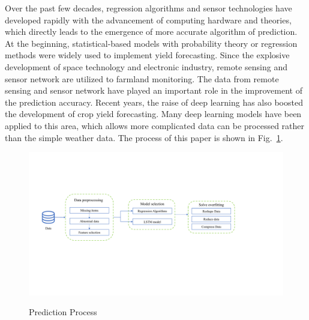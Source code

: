 \documentclass[conference]{IEEEtran}
\begin{document}
  Over the past few decades, regression algorithms and sensor technologies have developed rapidly with the advancement of computing hardware and theories, which directly leads to the emergence of more accurate algorithm of prediction. At the beginning, statistical-based models with probability theory or regression methods were widely used to implement yield forecasting\cite{Matis1985, stephens1995crop}. Since the explosive development of space technology and electronic industry, remote sensing and sensor network are utilized to farmland monitoring.  The data from remote sensing and sensor network have played an important role in the improvement of the prediction accuracy\cite{You2017, Baruth}. Recent years, the raise of deep learning has also boosted the development of crop yield forecasting. Many deep learning models have been applied to this area, which allows more complicated data can be processed rather than the simple weather data. The process of this paper is shown in Fig.~\ref{fig:arch}.
  
  \begin{figure}[!htb]
    \centering
    \includegraphics[width=\linewidth]{figures/arch.pdf}
    \label{fig:arch} 
    \caption{Prediction Process}
\end{figure}

\end{document}

